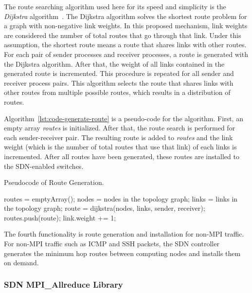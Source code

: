 The route searching algorithm used here for its speed and simplicity is
the \emph{Dijkstra} algorithm~\autocite{Dijkstra1959}. The Dijkstra
algorithm solves the shortest route problem for a graph with
non-negative link weights. In this proposed mechanism, link weights are
considered the number of total routes that go through that link. Under
this assumption, the shortest route means a route that shares links with
other routes. For each pair of sender processes and receiver processes,
a route is generated with the Dijkstra algorithm. After that, the weight
of all links contained in the generated route is incremented. This
procedure is repeated for all sender and receiver process pairs. This
algorithm selects the route that shares links with other routes from
multiple possible routes, which results in a distribution of routes.

Algorithm~\ref{lst:code-generate-route} is a pseudo-code for the algorithm.
First, an empty array \emph{routes} is initialized. After that, the
route search is performed for each sender-receiver pair. The resulting
route is added to \emph{routes} and the link weight (which is the number
of total routes that use that link) of each links is incremented. After
all routes have been generated, these routes are installed to the
SDN-enabled switches.

\begin{algorithm}
    \caption{Pseudocode of Route Generation.}%
    \label{lst:code-generate-route}
    \begin{algorithmic}
        \STATE routes = emptyArray();
        \STATE nodes = nodes in the topology graph;
        \STATE links = links in the topology graph;
            \STATE route = dijkstra(nodes, links, sender, receiver);
            \STATE routes.push(route);
                \STATE link.weight += 1;
            \ENDFOR
        \ENDFOR
    \end{algorithmic}
\end{algorithm}

The fourth functionality is route generation and installation for
non-MPI traffic. For non-MPI traffic such as ICMP and SSH packets, the
SDN controller generates the minimum hop routes between computing nodes
and installs them on demand.

\subsubsection{SDN MPI\_Allreduce Library}

